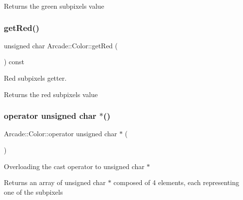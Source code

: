 \begin{DoxyReturn}{Returns}
the green subpixel\textquotesingle{}s value 
\end{DoxyReturn}
\mbox{\label{class_arcade_1_1_color_a536bf6ccc3a5024d5759eb267506742f}} 
\subsubsection{\texorpdfstring{get\+Red()}{getRed()}}
{\footnotesize\ttfamily unsigned char Arcade\+::\+Color\+::get\+Red (\begin{DoxyParamCaption}{ }\end{DoxyParamCaption}) const}



Red subpixel\textquotesingle{}s getter. 

\begin{DoxyReturn}{Returns}
the red subpixel\textquotesingle{}s value 
\end{DoxyReturn}
\mbox{\label{class_arcade_1_1_color_a65ecd14c3b6d508e43f6c2390dfa3215}} 
\subsubsection{\texorpdfstring{operator unsigned char $\ast$()}{operator unsigned char *()}}
{\footnotesize\ttfamily Arcade\+::\+Color\+::operator unsigned char $\ast$ (\begin{DoxyParamCaption}{ }\end{DoxyParamCaption})\hspace{0.3cm}{\ttfamily [explicit]}}

Overloading the cast operator to unsigned char $\ast$ \begin{DoxyReturn}{Returns}
an array of unsigned char $\ast$ composed of 4 elements, each representing one of the subpixels 
\end{DoxyReturn}
\mbox{\label{class_arcade_1_1_color_aa1081f4cf26dbb7a1af8b1a697ded873}} 
